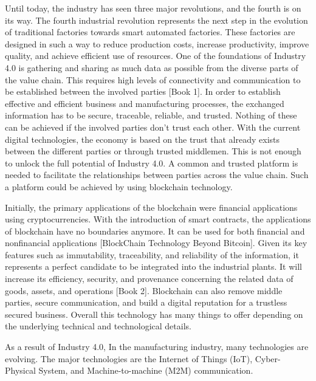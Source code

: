 \documentclass[runningheads]{llncs}
\begin{document}
Until today, the industry has seen three major revolutions, and the fourth is on its way. The fourth industrial revolution represents the next step in the evolution of traditional factories towards smart automated factories. These factories are designed in such a way to reduce production costs, increase productivity, improve quality, and achieve efficient use of resources. One of the foundations of Industry 4.0 is gathering and sharing as much data as possible from the diverse parts of the value chain. This requires high levels of connectivity and communication to be established between the involved parties [Book 1].  In order to establish effective and efficient business and manufacturing processes, the exchanged information has to be secure, traceable, reliable, and trusted. Nothing of these can be achieved if the involved parties don’t trust each other. With the current digital technologies, the economy is based on the trust that already exists between the different parties or through trusted middlemen. This is not enough to unlock the full potential of Industry 4.0. A common and trusted platform is needed to facilitate the relationships between parties across the value chain. Such a platform could be achieved by using blockchain technology.

Initially, the primary applications of the blockchain were financial applications using cryptocurrencies. With the introduction of smart contracts, the applications of blockchain have no boundaries anymore. It can be used for both financial and nonfinancial applications [BlockChain Technology Beyond Bitcoin]. Given its key features such as immutability, traceability, and reliability of the information, it represents a perfect candidate to be integrated into the industrial plants. It will increase its efficiency, security, and provenance concerning the related data of goods, assets, and operations [Book 2]. Blockchain can also remove middle parties, secure communication, and build a digital reputation for a trustless secured business. Overall this technology has many things to offer depending on the underlying technical and technological details. 


As a result of Industry 4.0, In the manufacturing industry, many technologies are evolving. The major technologies are the Internet of Things (IoT), Cyber-Physical System, and Machine-to-machine (M2M) communication. 
\end{document}
